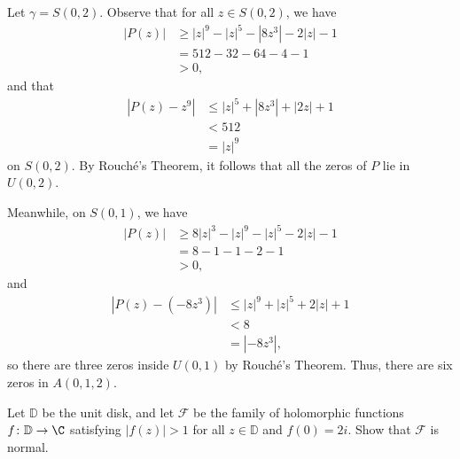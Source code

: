 \documentclass[10pt]{mypackage}
\renewcommand{\D}{\mathbb{D}}
\begin{document}
\begin{solution}
  Let $\gamma = S\left( 0,2 \right)$. Observe that for all $z\in S\left( 0,2 \right)$, we have
  \begin{align*}
    \left\vert P(z) \right\vert&\geq \left\vert z \right\vert^{9} - \left\vert z \right\vert^{5} - \left\vert 8z^3 \right\vert - 2\left\vert z \right\vert - 1\\
                               &= 512-32-64-4-1\\
                               &> 0,
  \end{align*}
  and that
  \begin{align*}
    \left\vert P(z) - z^{9} \right\vert &\leq \left\vert z \right\vert^{5} + \left\vert 8z^3 \right\vert + \left\vert 2z \right\vert + 1\\
                                        &< 512\\
                                        &= \left\vert z \right\vert^{9}
  \end{align*}
  on $S\left( 0,2 \right)$. By Rouché's Theorem, it follows that all the zeros of $P$ lie in $U\left( 0,2 \right)$.%

  Meanwhile, on $S\left( 0,1 \right)$, we have
  \begin{align*}
    \left\vert P(z) \right\vert &\geq 8\left\vert z \right\vert^3 - \left\vert z \right\vert^9 - \left\vert z \right\vert^5 - 2\left\vert z \right\vert - 1\\
                                &= 8-1-1-2-1\\
                                &> 0,
  \end{align*}
  and
  \begin{align*}
    \left\vert P(z) - \left( -8z^3 \right) \right\vert &\leq \left\vert z \right\vert^9 + \left\vert z \right\vert^5 + 2\left\vert z \right\vert + 1\\
                                                       &< 8\\
                                                       &= \left\vert -8z^3 \right\vert,
  \end{align*}
  so there are three zeros inside $U\left( 0,1 \right)$ by Rouché's Theorem. Thus, there are six zeros in $A\left( 0,1,2 \right)$.
\end{solution}
\begin{problem}[Problem 5]
  Let $\D$ be the unit disk, and let $\mathcal{F}$ be the family of holomorphic functions $f\colon \D\rightarrow \C$ satisfying $\left\vert f(z) \right\vert > 1$ for all $z\in \D$ and $f\left( 0 \right) = 2i$. Show that $\mathcal{F}$ is normal.
\end{problem}
\end{document}
